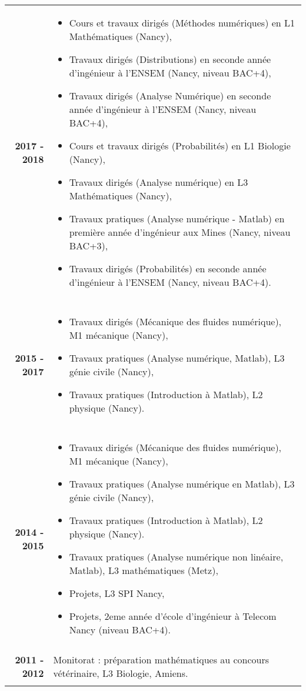 \documentclass[10pt,a4paper]{report}
\begin{document}
\noindent
\begin{center}
\begin{tabular}{r p{12cm}}
\textbf{2017 - 2018} & \begin{itemize}
\item Cours et travaux dirigés (Méthodes numériques) en L1 Mathématiques (Nancy),
\item Travaux dirigés (Distributions) en seconde année d'ingénieur à l'ENSEM (Nancy, niveau BAC+4),
\item Travaux dirigés (Analyse Numérique) en seconde année d'ingénieur à l'ENSEM (Nancy, niveau BAC+4),
\item Cours et travaux dirigés (Probabilités) en L1 Biologie (Nancy),
\item Travaux dirigés (Analyse numérique) en L3 Mathématiques (Nancy),
\item Travaux pratiques (Analyse numérique - Matlab) en première année d'ingénieur aux Mines (Nancy, niveau BAC+3),
\item Travaux dirigés (Probabilités) en seconde année d'ingénieur à l'ENSEM (Nancy, niveau BAC+4).
\end{itemize}\\

& \\

\textbf{2015 - 2017} & \begin{itemize}
\item Travaux dirigés (Mécanique des fluides numérique), M1 mécanique (Nancy),
\item Travaux pratiques (Analyse numérique, Matlab), L3 génie civile (Nancy),
\item Travaux pratiques (Introduction à Matlab), L2 physique (Nancy).
\end{itemize}\\

& \\

\textbf{2014 - 2015} & \begin{itemize}
\item Travaux dirigés (Mécanique des fluides numérique), M1 mécanique (Nancy),
\item Travaux pratiques (Analyse numérique en Matlab), L3 génie civile (Nancy),
\item Travaux pratiques (Introduction à Matlab), L2 physique (Nancy).
\item Travaux pratiques (Analyse numérique non linéaire, Matlab), L3 mathématiques (Metz),
\item Projets, L3 SPI Nancy,
\item Projets, 2eme année d'école d'ingénieur à Telecom Nancy (niveau BAC+4).
\end{itemize}\\

& \\

\textbf{2011 - 2012} & Monitorat : préparation mathématiques au concours vétérinaire, L3 Biologie, Amiens.\\

& \\
\end{tabular}
\end{center}
\end{document}
